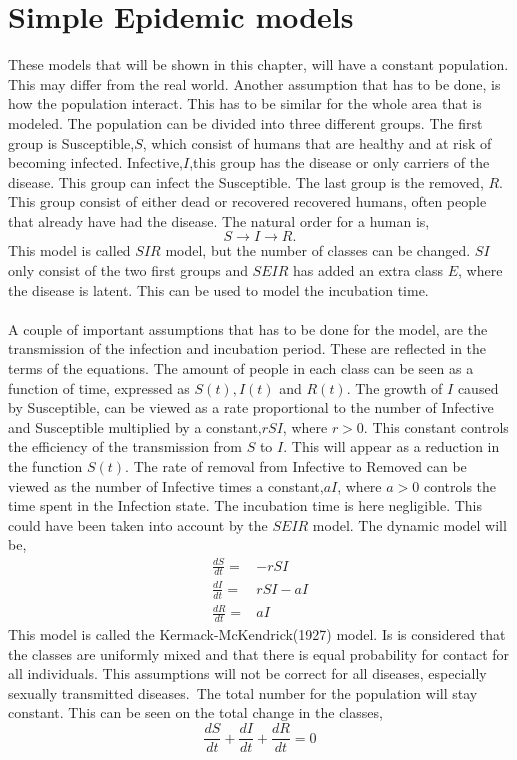 \documentclass[%
twoside,                 %
final,                   %
10pt]{article}
\begin{document}
\section{Simple Epidemic models}
These models that will be shown in this chapter, will have a constant population. This may differ from the real world. Another assumption that has to be done, is how the population interact. This has to be similar for the whole area that is modeled. The population can be divided into three different groups. The first group is Susceptible,$S$, which consist of humans that are healthy and at risk of becoming infected. Infective,$I$,this group has the disease or only carriers of the disease. This group can infect the Susceptible. The last group is the removed, $R$. This group consist of either dead or recovered recovered humans, often people that already have had the disease. The natural order for a human is,
\begin{equation}
S \rightarrow I \rightarrow R.
\end{equation}
This model is called $SIR$ model, but the number of classes can be changed. $SI$ only consist of the two first groups and $SEIR$ has added an extra class $E$, where the disease is latent. This can be used to model the incubation time. 
\\
\\
A couple of important assumptions that has to be done for the model, are the transmission of the infection and incubation period. These are reflected in the terms of the equations. The amount of people in each class can be seen as a function of time, expressed as $S(t),I(t)$ and $R(t)$. The growth of $I$ caused by Susceptible, can be viewed as a rate proportional to the number of Infective and Susceptible multiplied by a constant,$rSI$, where $r>0$. This constant controls the efficiency of the transmission from $S$ to $I$. This will appear as a reduction in the function $S(t)$. The rate of removal from Infective to Removed can be viewed as the number of Infective times a constant,$aI$, where $a>0$ controls the time spent in the Infection state. The incubation time is here negligible. This could have been taken into account by the $SEIR$ model. The dynamic model will be,
\begin{align*} \label{eq:SIR_model}
\frac{dS}{dt} =& -rSI \\
\frac{dI}{dt} =& rSI-aI \\
\frac{dR}{dt} =& aI
\end{align*}
This model is called the Kermack-McKendrick(1927) model. Is is considered that the classes are uniformly mixed and that there is equal probability for contact for all individuals. This assumptions will not be correct for all diseases, especially sexually transmitted diseases. The total number for the population will stay constant. This can be seen on the total change in the classes,
\begin{equation}
\frac{dS}{dt} + \frac{dI}{dt} + \frac{dR}{dt} = 0
\end{equation}
\end{document}
